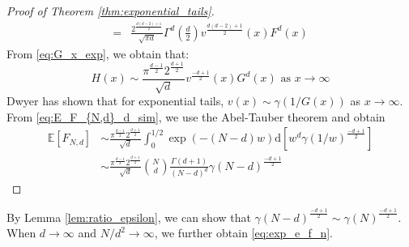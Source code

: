 \documentclass[conference,a4paper]{IEEEtran}
\def\E{\mathbb{E}}
\def\dd{\mathrm{d}}
\begin{document}
\begin{proof}[Proof of Theorem \ref{thm:exponential_tails}]
\begin{align*}
    =& \frac{2^{\frac{d(d-2)+1}{2}}}{\sqrt{\pi d}}\Gamma^d\left(\frac{d}{2}\right)
    v^{\frac{d(d-2)+1}{2}}(x)F^d(x)
\end{align*}
From \eqref{eq:G_x_exp}, we obtain that:
\begin{equation}\label{eq:H_x_exp}
     H(x) \sim \frac{\pi^{\frac{d-1}{2}} 2^{\frac{d+1}{2}}}{\sqrt{d}}v^{\frac{-d+1}{2}}(x)G^d(x)
     \textrm{ as } x\to \infty
\end{equation}
Dwyer \cite{dwyer1991convex} has shown that for exponential tails, $v(x) \sim \gamma(1/G(x))$ as $x\to \infty$.
From \eqref{eq:E_F_{N,d}_d_sim},
we use the Abel-Tauber theorem
\cite{omey1989abelian} and obtain
\begin{align*}
    \E[F_{N,d}] & \sim \frac{\pi^{\frac{d-1}{2}} 2^{\frac{d+1}{2}}}{\sqrt{d}}\int_0^{1/2} \exp(-(N-d)w) \dd [w^d \gamma(1/w)^{\frac{-d+1}{2}}] \\
    &\sim \frac{\pi^{\frac{d-1}{2}} 2^{\frac{d+1}{2}}}{\sqrt{d}} \binom{N}{d}\frac{\Gamma(d+1)}{(N-d)^d} \gamma(N-d)^{\frac{-d+1}{2}}
\end{align*}
\end{proof}


By Lemma \ref{lem:ratio_epsilon}, we can show that
$\gamma(N-d)^{\frac{-d+1}{2}}\sim \gamma(N)^{\frac{-d+1}{2}}$.
When $d\to\infty$ and $N/d^2\to \infty$, we further obtain \eqref{eq:exp_e_f_n}.
 
\end{document}

